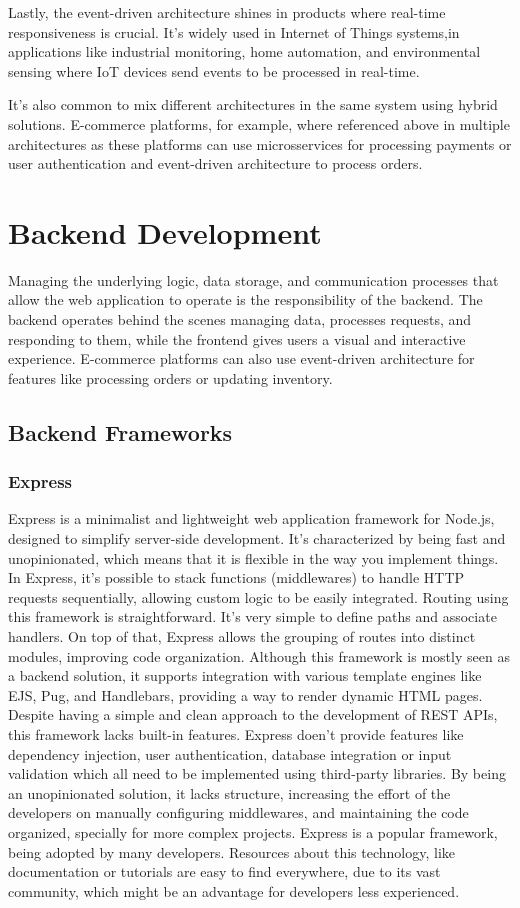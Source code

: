 Lastly, the event-driven architecture shines in products where real-time
responsiveness is crucial. It's widely used in Internet of Things systems,in
applications like industrial monitoring, home automation, and environmental
sensing where \gls{IoT} devices send events to be processed in real-time.

It's also common to mix different architectures in the same system using
hybrid solutions. E-commerce platforms, for example, where referenced above in
multiple architectures as these platforms can use microsservices for processing
payments or user authentication and event-driven architecture to process orders.

\section{Backend Development}
Managing the underlying logic, data storage, and communication processes that
allow the web application to operate is the responsibility of the backend.
The backend operates behind the scenes managing data, processes requests, and
responding to them, while the frontend gives users a visual and interactive
experience. E-commerce platforms can also use event-driven architecture for
features like processing orders or updating inventory.

\subsection{Backend Frameworks}
\subsubsection{Express}
Express is a minimalist and lightweight web application framework for Node.js,
designed to simplify server-side development. It's characterized by being
fast and unopinionated, which means that it is flexible in the way you implement
things.
In Express, it's possible to stack functions (middlewares) to handle \gls{HTTP}
requests sequentially, allowing custom logic to be easily integrated.
Routing using this framework is straightforward. It's very simple to define
paths and associate handlers. On top of that, Express allows the grouping of
routes into distinct modules, improving code organization.
Although this framework is mostly seen as a backend solution, it supports
integration with various template engines like \gls{EJS}, Pug, and Handlebars,
providing a way to render dynamic \gls{HTML} pages.
Despite having a simple and clean approach to the development of \gls{REST} \gls{API}s,
this framework lacks built-in features. Express doen't provide features like
dependency injection, user authentication, database integration or input
validation which all need to be implemented using third-party libraries.
By being an unopinionated solution, it lacks structure, increasing the effort
of the developers on manually configuring middlewares, and maintaining the code
organized, specially for more complex projects.
Express is a popular framework, being adopted by many developers. Resources
about this technology, like documentation or tutorials are easy to find
everywhere, due to its vast community, which might be an advantage for
developers less experienced.

